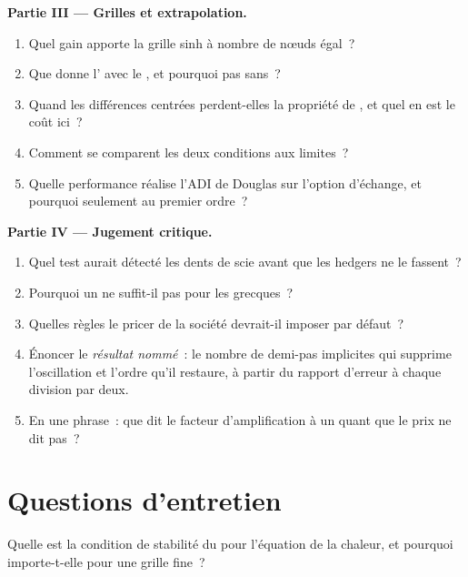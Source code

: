 \begin{problem}
\medskip\noindent\textbf{Partie III --- Grilles et extrapolation.}
\begin{enumerate}[resume]
\item Quel gain apporte la grille sinh à nombre de nœuds égal~?
\item Que donne l' avec le , et pourquoi pas sans~?
\item Quand les différences centrées perdent-elles la propriété de , et quel en est le coût ici~?
\item Comment se comparent les deux conditions aux limites~?
\item Quelle performance réalise l'ADI de Douglas sur l'option d'échange, et pourquoi seulement au premier ordre~?
\end{enumerate}

\medskip\noindent\textbf{Partie IV --- Jugement critique.}
\begin{enumerate}[resume]
\item Quel test aurait détecté les dents de scie avant que les hedgers ne le fassent~?
\item Pourquoi un  ne suffit-il pas pour les grecques~?
\item Quelles règles le pricer de la société devrait-il imposer par défaut~?
\item Énoncer le \emph{résultat nommé}~: le nombre de demi-pas implicites qui supprime l'oscillation et l'ordre qu'il restaure, à partir du rapport d'erreur à chaque division par deux.
\item En une phrase~: que dit le facteur d'amplification à un quant que le prix ne dit pas~?
\end{enumerate}
\end{problem}

\section{Questions d'entretien}

\begin{interviewq}\label{iq:qm:finite-difference-methods:1}
Quelle est la condition de stabilité du  pour l'équation de la chaleur, et pourquoi importe-t-elle pour une grille fine~?
\end{interviewq}

